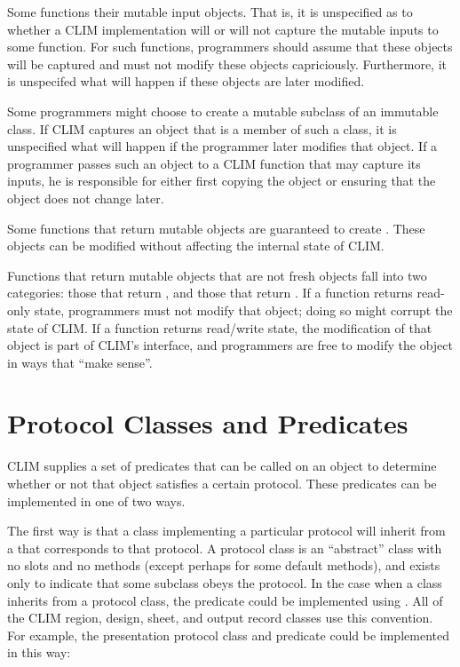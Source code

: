 Some functions  their mutable input objects.  That is, it
is unspecified as to whether a CLIM implementation will or will not capture the
mutable inputs to some function.  For such functions, programmers should assume
that these objects will be captured and must not modify these objects
capriciously.  Furthermore, it is unspecifed what will happen if these objects
are later modified.

Some programmers might choose to create a mutable subclass of an immutable
class.  If CLIM captures an object that is a member of such a class, it is
unspecified what will happen if the programmer later modifies that object.  If a
programmer passes such an object to a CLIM function that may capture its inputs,
he is responsible for either first copying the object or ensuring that the
object does not change later.

Some functions that return mutable objects are guaranteed to create
.  These objects can be modified without affecting the
internal state of CLIM.

Functions that return mutable objects that are not fresh objects fall into two
categories: those that return , and those that return
.  If a function returns read-only state, programmers
must not modify that object; doing so might corrupt the state of CLIM.  If a
function returns read/write state, the modification of that object is part of
CLIM's interface, and programmers are free to modify the object in ways that
``make sense''.


\section {Protocol Classes and Predicates}

CLIM supplies a set of predicates that can be called on an object to determine
whether or not that object satisfies a certain protocol.  These predicates can
be implemented in one of two ways.

The first way is that a class implementing a particular protocol will inherit
from a  that corresponds to that protocol.  A protocol
class is an ``abstract'' class with no slots and no methods (except perhaps for
some default methods), and exists only to indicate that some subclass obeys the
protocol.  In the case when a class inherits from a protocol class, the
predicate could be implemented using .  All of the CLIM region,
design, sheet, and output record classes use this convention.  For example, the
presentation protocol class and predicate could be implemented in this way:

